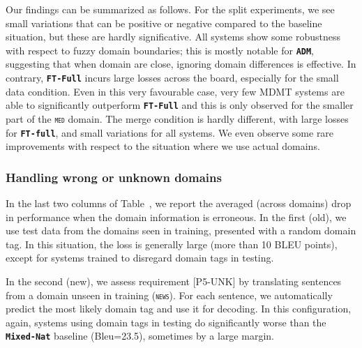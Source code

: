 \documentclass[11pt,a4paper]{article}
\newcommand{\fyDone}[1]{\done[FY]\Todo[FY:]{\textcolor{orange}{#1}}}
\newcommand{\domain}[1]{\texttt{\textsc{#1}}}
\newcommand{\system}[1]{\texttt{\textbf{#1}}}
\begin{document}
Our findings can be summarized as follows. For the split experiments, we see small variations that can be positive or negative compared to the baseline situation, but these are hardly significative. All systems show some robustness with respect to fuzzy domain boundaries; this is mostly notable for \system{ADM}, suggesting that when domain are close, ignoring domain differences is effective. In contrary, \system{FT-Full} incurs large losses across the board, especially for the small data condition. Even in this very favourable case, very few MDMT systems are able to significantly outperform \system{FT-Full} and this is only observed for the smaller part of the \domain{med} domain. The merge condition is hardly different, with large losses for \system{FT-full}, and small variations for all systems. We even observe some rare improvements with respect to the situation where we use actual domains.\fyDone{More comments ?}

\subsubsection{Handling wrong or unknown domains \label{sssec:unknowns}}
\fyDone{Prepare table for the wrong domain analysis (see also last col. of the first table)}In the last two columns of Table~\label{tab:redomains}, we report the averaged (across domains) drop in performance when the domain information is erroneous. In the first (old), we use test data from the domains seen in training, presented with a random domain tag. In this situation, the loss is generally large (more than 10 BLEU points), except for systems trained to disregard domain tags in testing.\fyDone{Comments?}

In the second (new), we assess requirement [P5-UNK] by translating sentences from a domain unseen in training (\domain{news}). For each sentence, we automatically predict the most likely domain tag and use it for decoding.
In this configuration, again, systems using domain tags in testing do significantly worse than the \system{Mixed-Nat} baseline (Bleu=23.5), sometimes by a large margin.\fyDone{Check significance, To be completed}
\end{document}
